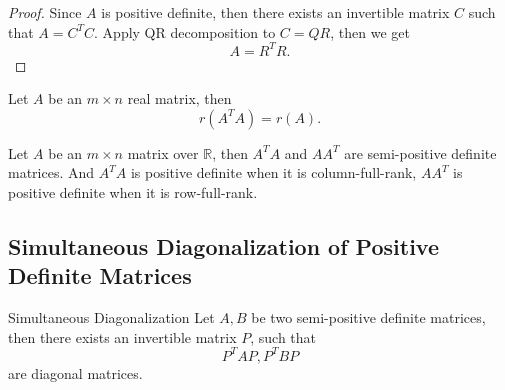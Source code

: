 \begin{proof}
  Since $A$ is positive definite, then there exists an invertible matrix $C$
  such that $A = C^TC$.
  Apply QR decomposition to $C = QR$, then we get
  \begin{equation}
    A = R^TR.
  \end{equation}
\end{proof}

\begin{lemma}{}{}
  Let $A$ be an $m \times n$ real matrix, then
  \begin{equation}
    r(A^TA) = r(A).
  \end{equation}
\end{lemma}

\begin{theorem}{}{}
  Let $A$ be an $m \times n$ matrix over $\mathbb{R}$,
  then $A^TA$ and $AA^T$ are semi-positive definite matrices.
  And $A^TA$ is positive definite when it is column-full-rank,
  $AA^T$ is positive definite when it is row-full-rank.
\end{theorem}

\subsection{Simultaneous Diagonalization of Positive Definite Matrices}

\begin{proposition}{Simultaneous Diagonalization}{}
  Let $A, B$ be two semi-positive definite matrices,
  then there exists an invertible matrix $P$, such that
  \begin{equation}
    P^TAP, P^TBP
  \end{equation}
  are diagonal matrices.
\end{proposition}






